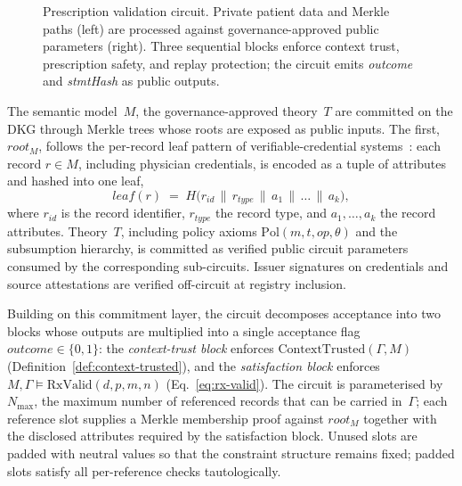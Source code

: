 \documentclass[journal]{IEEEtran}
\begin{document}
\begin{figure}[t]
{%
}%
\caption{Prescription validation circuit. Private patient data
and Merkle paths (left) are processed against
governance-approved public parameters (right).
Three sequential blocks enforce context trust, prescription
safety, and replay protection; the circuit emits
\textit{outcome} and \textit{stmtHash} as public outputs.}
\label{fig:circuit-flow}
\end{figure}

The semantic model~$M$, the governance-approved theory~$T$
are committed on the DKG through Merkle trees whose roots are
exposed as public inputs.
The first, $\mathit{root}_M$, follows the per-record leaf
pattern of verifiable-credential
systems~\cite{rosenberg2023zkcreds}:
each record $r \in M$, including physician credentials, is
encoded as a tuple of attributes and hashed into one leaf,
\begin{equation}
\mathit{leaf}(r) \;=\; H\bigl(
r_{\mathit{id}} \,\|\,
r_{\mathit{type}} \,\|\,
a_1 \,\|\, \dots \,\|\, a_k
\bigr),
\label{eq:leaf}
\end{equation}
where $r_{\mathit{id}}$ is the record identifier,
$r_{\mathit{type}}$ the record type, and $a_1,\dots,a_k$ the
record attributes.
Theory~$T$, including policy axioms
$\mathrm{Pol}(m,t,\mathit{op},\theta)$ and the subsumption
hierarchy, is committed as verified public circuit parameters
consumed by the corresponding sub-circuits.
Issuer signatures on credentials and source attestations are
verified off-circuit at registry inclusion.

Building on this commitment layer, the circuit decomposes
acceptance into two blocks whose outputs are multiplied into
a single acceptance flag $\mathit{outcome}\in\{0,1\}$:
the \emph{context-trust block} enforces
$\mathrm{ContextTrusted}(\Gamma,M)$
(Definition~\ref{def:context-trusted}), and the
\emph{satisfaction block} enforces
$M,\Gamma\models\mathrm{RxValid}(d,p,m,n)$
(Eq.~\ref{eq:rx-valid}).
The circuit is parameterised by~$N_{\max}$, the maximum
number of referenced records that can be carried in~$\Gamma$;
each reference slot supplies a Merkle membership proof
against $\mathit{root}_M$ together with the disclosed
attributes required by the satisfaction block.
Unused slots are padded with neutral values so that the
constraint structure remains fixed; padded slots satisfy all
per-reference checks tautologically.
\end{document}

